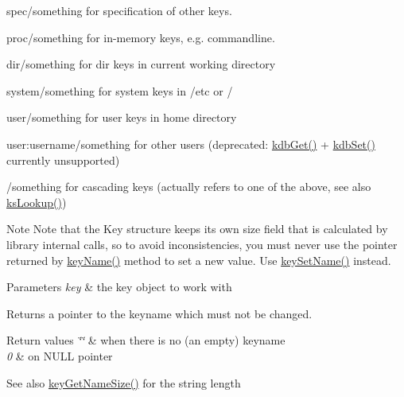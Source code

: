 \begin{DoxyItemize}
\item {\ttfamily spec/something} for specification of other keys.
\item {\ttfamily proc/something} for in-\/memory keys, e.\+g. commandline.
\item {\ttfamily dir/something} for dir keys in current working directory
\item {\ttfamily system/something} for system keys in /etc or /
\item {\ttfamily user/something} for user keys in home directory
\item {\ttfamily user\+:username/something} for other users (deprecated\+: \mbox{\hyperlink{group__kdb_ga28e385fd9cb7ccfe0b2f1ed2f62453a1}{kdb\+Get()}} + \mbox{\hyperlink{group__kdb_ga11436b058408f83d303ca5e996832bcf}{kdb\+Set()}} currently unsupported)
\item {\ttfamily /something} for cascading keys (actually refers to one of the above, see also \mbox{\hyperlink{group__keyset_gaa34fc43a081e6b01e4120daa6c112004}{ks\+Lookup()}})

\begin{DoxyNote}{Note}
Note that the Key structure keeps its own size field that is calculated by library internal calls, so to avoid inconsistencies, you must never use the pointer returned by \mbox{\hyperlink{group__keyname_ga8e805c726a60da921d3736cda7813513}{key\+Name()}} method to set a new value. Use \mbox{\hyperlink{group__keyname_ga7699091610e7f3f43d2949514a4b35d9}{key\+Set\+Name()}} instead.
\end{DoxyNote}

\begin{DoxyParams}{Parameters}
{\em key} & the key object to work with \\
\hline
\end{DoxyParams}
\begin{DoxyReturn}{Returns}
a pointer to the keyname which must not be changed. 
\end{DoxyReturn}

\begin{DoxyRetVals}{Return values}
{\em \char`\"{}\char`\"{}} & when there is no (an empty) keyname \\
\hline
{\em 0} & on N\+U\+LL pointer \\
\hline
\end{DoxyRetVals}
\begin{DoxySeeAlso}{See also}
\mbox{\hyperlink{group__keyname_gabdbcfa51ed8a387e47ead207affa2d2e}{key\+Get\+Name\+Size()}} for the string length 


\end{DoxySeeAlso}
\end{DoxyItemize}
